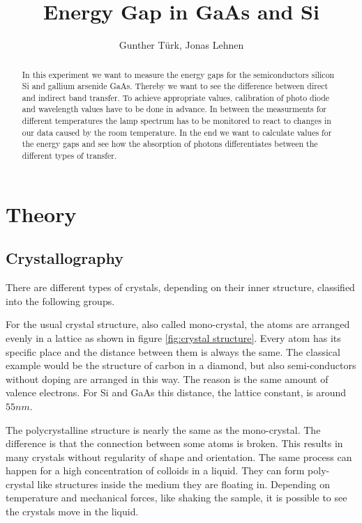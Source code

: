 \documentclass[]{article}
\title{Energy Gap in GaAs and Si}
\author{Gunther T\"urk, Jonas Lehnen}
\begin{document}
\maketitle
\begin{abstract}
In this experiment we want to measure the energy gaps for the semiconductors silicon Si and gallium arsenide GaAs. Thereby we want to see the difference between direct and indirect band transfer. To achieve appropriate values, calibration of photo diode and wavelength values have to be done in advance. In between the measurments for different temperatures the lamp spectrum has to be monitored to react to changes in our data caused by the room temperature. In the end we want to calculate values for the energy gaps and see how the absorption of photons differentiates between the different types of transfer.

\end{abstract}

\tableofcontents

\newpage
\section{Theory}
\subsection{Crystallography}
There are different types of crystals, depending on their inner structure, classified into the following groups. 

For the usual crystal structure, also called mono-crystal, the atoms are arranged evenly in a lattice as shown in figure \ref{fig:crystal structure}. Every atom has its specific place and the distance between them is always the same. The classical example would be the structure of carbon in a diamond, but also semi-conductors without doping are arranged in this way. The reason is the same amount of valence electrons. For Si and GaAs this distance, the lattice constant, is around $55nm$.

The polycrystalline structure is nearly the same as the mono-crystal. The difference is that the connection between some atoms is broken. This results in many crystals without regularity of shape and orientation. The same process can happen for a high concentration of colloids in a liquid. They can form poly-crystal like structures inside the medium they are floating in. Depending on temperature and mechanical forces, like shaking the sample, it is possible to see the crystals move in the liquid.
\end{document}
